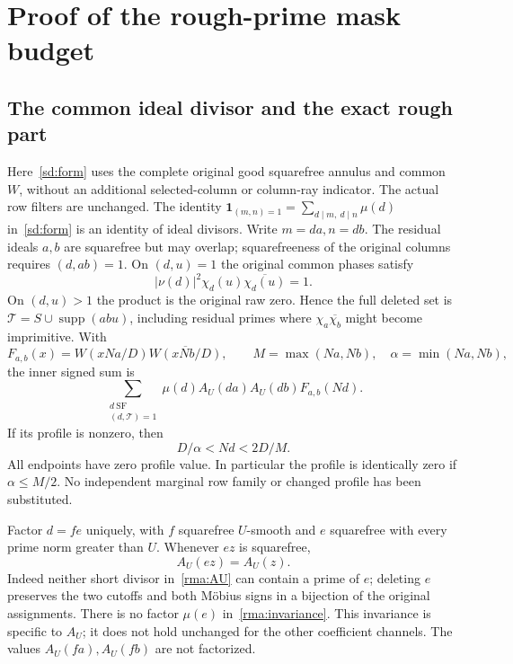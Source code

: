 \section{Proof of the rough-prime mask budget}\label{rma:details}
\subsection{The common ideal divisor and the exact rough part}
Here~\eqref{sd:form} uses the complete original good squarefree
annulus and common $W$, without an additional selected-column or
column-ray indicator. The actual row filters are unchanged.
The identity $\mathbf1_{(m,n)=1}=\sum_{d\mid m,\ d\mid n}\mu(d)$
in~\eqref{sd:form} is an identity of ideal divisors. Write $m=da,n=db$.
The residual ideals $a,b$ are squarefree but may overlap; squarefreeness
of the original columns requires $(d,ab)=1$. On $(d,u)=1$ the original
common phases satisfy
\[
 |\nu(d)|^2\chi_d(u)\overline{\chi_d(u)}=1.
\]
On $(d,u)>1$ the product is the original raw zero. Hence the full deleted
set is $\mathcal T=S\cup\operatorname{supp}(abu)$, including residual
primes where $\chi_a\overline{\chi_b}$ might become imprimitive.
With
\[
 F_{a,b}(x)=W(xNa/D)\overline{W(xNb/D)},\qquad
 M=\max(Na,Nb),\quad\alpha=\min(Na,Nb),
\]
the inner signed sum is
\begin{equation}\label{rma:inner}
 \sum_{\substack{d\ \mathrm{SF}\\(d,\mathcal T)=1}}
             \mu(d)A_U(da)A_U(db)F_{a,b}(Nd).
\end{equation}
If its profile is nonzero, then
\begin{equation}\label{rma:support}
 D/\alpha<Nd<2D/M.
\end{equation}
All endpoints have zero profile value. In particular the profile is
identically zero if $\alpha\le M/2$. No independent marginal row family
or changed profile has been substituted.

Factor $d=fe$ uniquely, with $f$ squarefree $U$-smooth and $e$ squarefree
with every prime norm greater than $U$. Whenever $ez$ is squarefree,
\begin{equation}\label{rma:invariance}
 A_U(ez)=A_U(z).
\end{equation}
Indeed neither short divisor in~\eqref{rma:AU} can contain a prime of
$e$; deleting $e$ preserves the two cutoffs and both M\"obius signs in
a bijection of the original assignments. There is no factor $\mu(e)$
in~\eqref{rma:invariance}. This invariance is specific to $A_U$; it does
not hold unchanged for the other coefficient channels. The values
$A_U(fa),A_U(fb)$ are not factorized.

